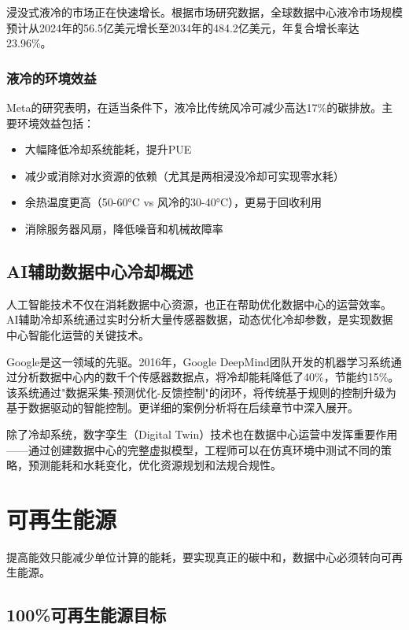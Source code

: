 浸没式液冷的市场正在快速增长。根据市场研究数据，全球数据中心液冷市场规模预计从2024年的56.5亿美元增长至2034年的484.2亿美元，年复合增长率达23.96\%。

\subsubsection{液冷的环境效益}

Meta的研究表明，在适当条件下，液冷比传统风冷可减少高达17\%的碳排放。主要环境效益包括：
\begin{itemize}
    \item 大幅降低冷却系统能耗，提升PUE
    \item 减少或消除对水资源的依赖（尤其是两相浸没冷却可实现零水耗）
    \item 余热温度更高（50-60°C vs 风冷的30-40°C），更易于回收利用
    \item 消除服务器风扇，降低噪音和机械故障率
\end{itemize}

\subsection{AI辅助数据中心冷却概述}

人工智能技术不仅在消耗数据中心资源，也正在帮助优化数据中心的运营效率。AI辅助冷却系统通过实时分析大量传感器数据，动态优化冷却参数，是实现数据中心智能化运营的关键技术。

Google是这一领域的先驱。2016年，Google DeepMind团队开发的机器学习系统通过分析数据中心内的数千个传感器数据点，将冷却能耗降低了40\%，节能约15\%。该系统通过"数据采集-预测优化-反馈控制"的闭环，将传统基于规则的控制升级为基于数据驱动的智能控制。更详细的案例分析将在后续章节中深入展开。

除了冷却系统，数字孪生（Digital Twin）技术也在数据中心运营中发挥重要作用——通过创建数据中心的完整虚拟模型，工程师可以在仿真环境中测试不同的策略，预测能耗和水耗变化，优化资源规划和法规合规性。

\section{可再生能源}\label{sec:renewable-energy}

提高能效只能减少单位计算的能耗，要实现真正的碳中和，数据中心必须转向可再生能源。

\subsection{100\%可再生能源目标}

